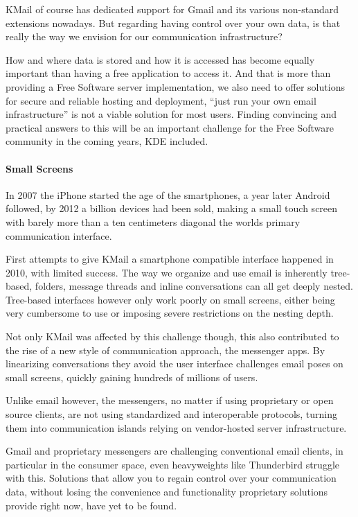 KMail of course has dedicated support for Gmail and its various non-standard extensions nowadays. But regarding having control over your own data, is that really the way we envision for our communication infrastructure?

How and where data is stored and how it is accessed has become equally important than having a free application to access it. And that is more than providing a Free Software server implementation, we also need to offer solutions for secure and reliable hosting and deployment, “just run your own email infrastructure” is not a viable solution for most users. Finding convincing and practical answers to this will be an important challenge for the Free Software community in the coming years, KDE included.

\paragraph{Small Screens}

In 2007 the iPhone started the age of the smartphones, a year later Android followed, by 2012 a billion devices had been sold, making a small touch screen with barely more than a ten centimeters diagonal the worlds primary communication interface.

First attempts to give KMail a smartphone compatible interface happened in 2010, with limited success. The way we organize and use email is inherently tree-based, folders, message threads and inline conversations can all get deeply nested. Tree-based interfaces however only work poorly on small screens, either being very cumbersome to use or imposing severe restrictions on the nesting depth.

Not only KMail was affected by this challenge though, this also contributed to the rise of a new style of communication approach, the messenger apps. By linearizing conversations they avoid the user interface challenges email poses on small screens, quickly gaining hundreds of millions of users.

Unlike email however, the messengers, no matter if using proprietary or open source clients, are not using standardized and interoperable protocols, turning them into communication islands relying on vendor-hosted server infrastructure.

Gmail and proprietary messengers are challenging conventional email clients, in particular in the consumer space, even heavyweights like Thunderbird struggle with this. Solutions that allow you to regain control over your communication data, without losing the convenience and functionality proprietary solutions provide right now, have yet to be found.

